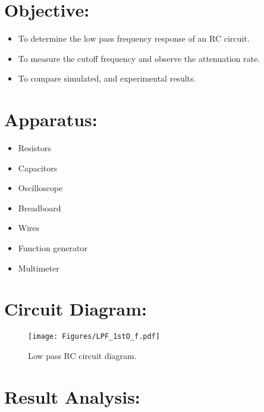 \documentclass[a4paper, 12pt]{extarticle}
\begin{document}
\section{Objective:}
    \begin{itemize}
        \item To determine the low pass frequency response of an RC circuit.
        \item To measure the cutoff frequency and observe the attenuation rate.
        \item To compare simulated, and experimental results.
    \end{itemize}

\section{Apparatus:}
\begin{minipage}[t]{0.45\linewidth}
    \begin{itemize}
        \item Resistors
        \item Capacitors
        \item Oscilloscope
    \end{itemize}
\end{minipage}
\hfill
\begin{minipage}[t]{0.45\linewidth}
    \begin{itemize}
        \item Breadboard
        \item Wires
        \item Function generator
        \item Multimeter
    \end{itemize}
\end{minipage}

\section{Circuit Diagram:}
\begin{figure}[htbp]
    \centering
    \texttt{[image: Figures/LPF\_1stO\_f.pdf]}
    \caption{Low pass RC circuit diagram.}
    \label{fig:Low_Pass_RC_Circuit}
\end{figure}

\newpage
\restoregeometry
{}

\section{Result Analysis:}
\end{document}
